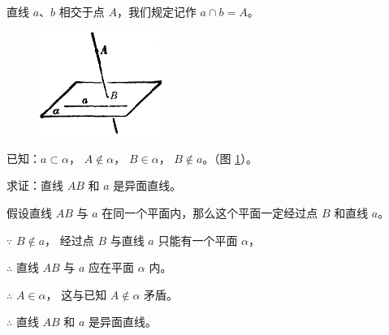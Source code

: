 直线 $a$、$b$ 相交于点 $A$，我们规定记作 $a \cap b = A$。

\liti[0] 

\begin{figure}
    \centering
    \includegraphics[width=4cm]{../pic/ltjh-ch1-13.png}
    \caption{}\label{fig:ltjh-1-13}
\end{figure}

已知：$a \subset \alpha$， $A \not \in \alpha$， $B \in \alpha$， $B \not \in a$。（图 \ref{fig:ltjh-1-13}）。

求证：直线 $AB$ 和 $a$ 是异面直线。

\zhengming 假设直线 $AB$ 与 $a$ 在同一个平面内，那么这个平面一定经过点 $B$ 和直线 $a$。

$\because$ \quad $B \not \in a$， 经过点 $B$ 与直线 $a$ 只能有一个平面 $\alpha$，

$\therefore$ \quad 直线 $AB$ 与 $a$ 应在平面 $\alpha$ 内。

$\therefore$ \quad $A \in \alpha$， 这与已知 $A \not \in \alpha$ 矛盾。

$\therefore$ \quad 直线 $AB$ 和 $a$ 是异面直线。


